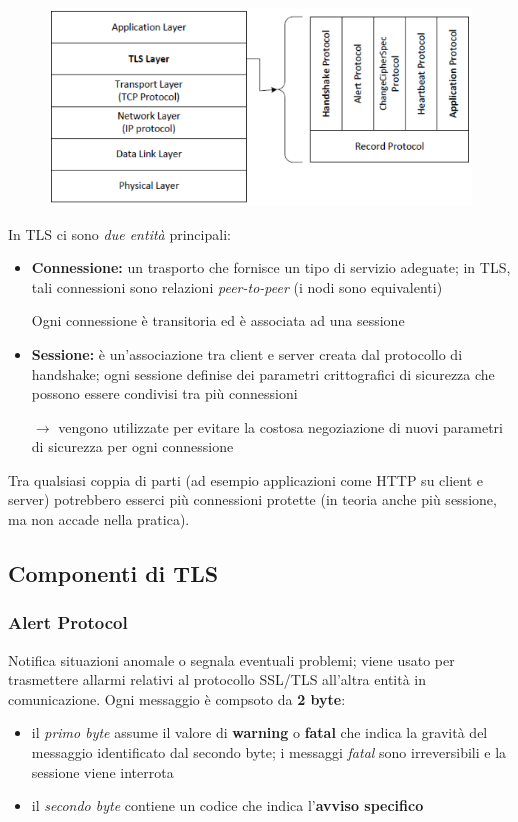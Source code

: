 \begin{figure}[H]
    \centering
    \includegraphics[width=1\linewidth]{chapters/10/images/tls-basics.png}
\end{figure}

\noindent In TLS ci sono \textit{due entità} principali:
\begin{itemize}
    \item \textbf{Connessione:} un trasporto che fornisce un tipo di servizio adeguate; in TLS, 
    tali connessioni sono relazioni \textit{peer-to-peer} (i nodi sono equivalenti)

    \noindent Ogni connessione è transitoria ed è associata ad una sessione
    \item \textbf{Sessione:} è un'associazione tra client e server creata dal protocollo di handshake;
    ogni sessione definise dei parametri crittografici di sicurezza che possono 
    essere condivisi tra più connessioni
    
    $\rightarrow$ vengono utilizzate per evitare la costosa negoziazione 
    di nuovi parametri di sicurezza per ogni connessione
\end{itemize}

\noindent Tra qualsiasi coppia di parti (ad esempio applicazioni come HTTP su client 
e server) potrebbero esserci più connessioni protette (in teoria anche più sessione,
ma non accade nella pratica).

\subsection{Componenti di TLS}

\subsubsection{Alert Protocol}
Notifica situazioni anomale o segnala eventuali problemi; viene usato per 
trasmettere allarmi relativi al protocollo SSL/TLS all'altra entità in 
comunicazione. Ogni messaggio è compsoto da \textbf{2 byte}:
\begin{itemize}
    \item il \textit{primo byte} assume il valore di \textbf{warning} o \textbf{fatal}
    che indica la gravità del messaggio identificato dal secondo byte; i messaggi \textit{fatal}
    sono irreversibili e la sessione viene interrota
    \item il \textit{secondo byte} contiene un codice che indica l'\textbf{avviso specifico}
\end{itemize}

